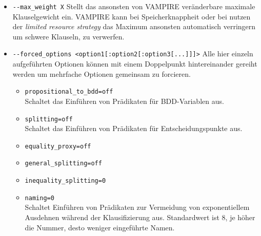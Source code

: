 \documentclass{article}
\begin{document}
\begin{itemize}
\item \verb|--max_weight X| \label{arg:maxweight}
Stellt das ansonsten von VAMPIRE veränderbare maximale Klauselgewicht ein. VAMPIRE kann bei Speicherknappheit oder bei nutzen der \emph{limited resource strategy} das Maximum ansonsten automatisch verringern um schwere Klauseln, zu verwerfen.

\item \verb|--forced_options <option1[:option2[:option3[...]]]>| \label{arg:forcedoptions}
Alle hier einzeln aufgeführten Optionen können mit einem Doppelpunkt hintereinander gereiht werden um mehrfache Optionen gemeinsam zu forcieren. 
\begin{itemize}
	\item \verb|propositional_to_bdd=off| \\
	Schaltet das Einführen von Prädikaten für BDD-Variablen aus.
	\item \verb|splitting=off| \\
	Schaltet das Einführen von Prädikaten für Entscheidungspunkte aus.
	\item \verb|equality_proxy=off|
	\item \verb|general_splitting=off|
	\item \verb|inequality_splitting=0|
	\item \verb|naming=0| \\
	Schaltet Einführen von Prädikaten zur Vermeidung von exponentiellem Ausdehnen während der Klausifizierung aus.
	Standardwert ist 8, je höher die Nummer, desto weniger eingeführte Namen.\\
\end{itemize}


\end{itemize}
\end{document}
